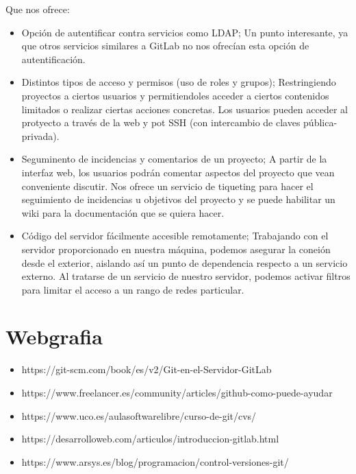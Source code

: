 \documentclass[12pt,letterpaper]{article}
\begin{document}
Que nos ofrece:

\begin{itemize}
    \item Opción de autentificar contra servicios como LDAP; Un punto interesante, ya que otros servicios similares a GitLab no nos ofrecían esta opción de autentificación.
    \item Distintos tipos de acceso y permisos (uso de roles y grupos); Restringiendo proyectos a ciertos usuarios y permitiendoles acceder a ciertos contenidos limitados o realizar ciertas acciones concretas. Los usuarios pueden acceder al protyecto a través de la web y pot SSH (con intercambio de claves pública-privada).
    \item Seguminento de incidencias y comentarios de un proyecto; A partir de la interfaz web, los usuarios podrán comentar aspectos del proyecto que vean conveniente discutir. Nos ofrece un servicio de tiqueting para hacer el seguimiento de incidencias u objetivos del proyecto y se puede habilitar un wiki para la documentación que se quiera hacer.
    \item Código del servidor fácilmente accesible remotamente; Trabajando con el servidor proporcionado en nuestra máquina, podemos asegurar la coneión desde el exterior, aislando así un punto de dependencia respecto a un servicio externo. Al tratarse de un servicio de nuestro servidor, podemos activar filtros para limitar el acceso a un rango de redes particular.
\end{itemize}

\section{Webgrafia}
\begin{itemize}
    \item https://git-scm.com/book/es/v2/Git-en-el-Servidor-GitLab 
    \item https://www.freelancer.es/community/articles/github-como-puede-ayudar
    \item https://www.uco.es/aulasoftwarelibre/curso-de-git/cvs/
    \item https://desarrolloweb.com/articulos/introduccion-gitlab.html
    \item https://www.arsys.es/blog/programacion/control-versiones-git/
\end{itemize}
\end{document}
